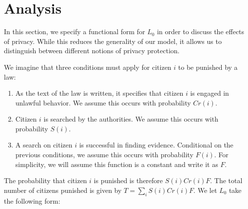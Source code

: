 
\section{Analysis}
\label{sec:analysis}



In this section, we specify a functional form for $L_0$ in order to discuss the effects of privacy.  While this reduces the generality of our model, it allows us to distinguish between different notions of privacy protection.  

We imagine that three conditions must apply for citizen $i$ to be punished by a law:

\begin{enumerate}
\item As the text of the law is written, it specifies that citizen $i$ is engaged in unlawful behavior.  We assume this occurs with probability $Cr(i)$.
\item Citizen $i$ is searched by the authorities.  We assume this occurs with probability $S(i)$.
\item A search on citizen $i$ is successful in finding evidence.  Conditional on the previous conditions, we assume this occurs with probability $F(i)$.  For simplicity, we will assume this function is a constant and write it as $F$.
\end{enumerate}

The probability that citizen $i$ is punished is therefore $S(i)Cr(i)F$.  The total number of citizens punished is given by $T = \sum_i S(i)Cr(i)F$.  We let $L_0$ take the following form:


